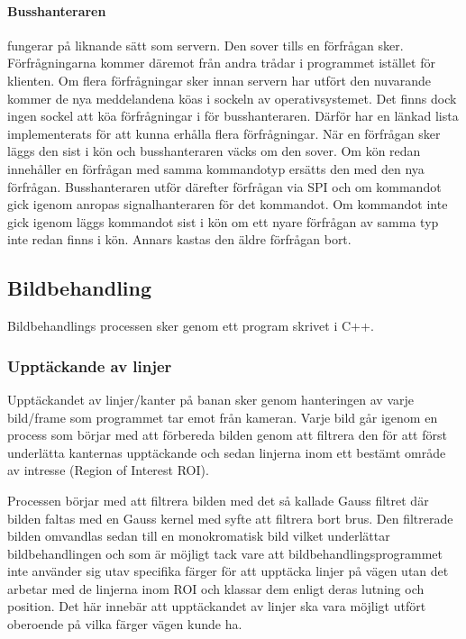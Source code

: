 \documentclass[tekniskrapport/tech.tex]{subfiles}
\begin{document}
\paragraph{Busshanteraren} fungerar på liknande sätt som servern. Den sover
tills en förfrågan sker. Förfrågningarna kommer däremot från andra trådar i
programmet istället för klienten. Om flera förfrågningar sker innan servern har
utfört den nuvarande kommer de nya meddelandena köas i sockeln av
operativsystemet. Det finns dock ingen sockel att köa förfrågningar i för
busshanteraren. Därför har en länkad lista implementerats för att kunna erhålla
flera förfrågningar. När en förfrågan sker läggs den sist i kön och
busshanteraren väcks om den sover. Om kön redan innehåller en förfrågan med
samma kommandotyp ersätts den med den nya förfrågan. Busshanteraren utför
därefter förfrågan via SPI och om kommandot gick igenom anropas
signalhanteraren för det kommandot. Om kommandot inte gick igenom läggs
kommandot sist i kön om ett nyare förfrågan av samma typ inte redan finns i
kön. Annars kastas den äldre förfrågan bort.

\subsection{Bildbehandling}
Bildbehandlings processen sker genom ett program skrivet i C++.

\subsubsection{Upptäckande av linjer}
Upptäckandet av linjer/kanter på banan sker genom hanteringen av varje
bild/frame som programmet tar emot från kameran. Varje bild går igenom en
process som börjar med att förbereda bilden genom att filtrera den för att
först underlätta kanternas upptäckande och sedan linjerna inom ett bestämt
område av intresse (Region of Interest ROI).

Processen börjar med att filtrera bilden med det så kallade Gauss filtret där
bilden faltas med en Gauss kernel med syfte att filtrera bort brus. Den
filtrerade bilden omvandlas sedan till en monokromatisk bild vilket underlättar
bildbehandlingen och som är möjligt tack vare att bildbehandlingsprogrammet
inte använder sig utav specifika färger för att upptäcka linjer på vägen utan
det arbetar med de linjerna inom ROI och klassar dem enligt deras lutning och
position. Det här innebär att upptäckandet av linjer ska vara möjligt utfört
oberoende på vilka färger vägen kunde ha. 
\end{document}
